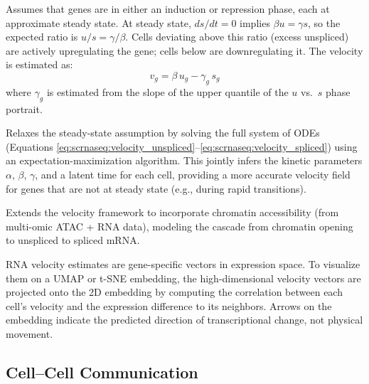\begin{description}[style=nextline]
  \item[Steady-state model (\software{velocyto})] Assumes that genes are in
    either an induction or repression phase, each at approximate steady state.
    At steady state, $ds/dt = 0$ implies $\beta u = \gamma s$, so the expected
    ratio is $u/s = \gamma/\beta$. Cells deviating above this ratio (excess
    unspliced) are actively upregulating the gene; cells below are downregulating
    it. The velocity is estimated as:
    \begin{equation}
      \label{eq:scrnaseq:velocity_ss}
      v_g = \beta\, u_g - \gamma_g\, s_g
    \end{equation}
    where $\gamma_g$ is estimated from the slope of the upper quantile of the
    $u$ vs.\ $s$ phase portrait.
  \item[Dynamical model (\software{scVelo})] Relaxes the steady-state assumption
    by solving the full system of ODEs (Equations
    \ref{eq:scrnaseq:velocity_unspliced}--\ref{eq:scrnaseq:velocity_spliced})
    using an expectation-maximization algorithm. This jointly infers the kinetic
    parameters $\alpha$, $\beta$, $\gamma$, and a latent time for each cell,
    providing a more accurate velocity field for genes that are not at steady
    state (e.g., during rapid transitions).
  \item[Multi-omic velocity (\software{MultiVelo})] Extends the velocity
    framework to incorporate chromatin accessibility (from multi-omic
    ATAC + RNA data), modeling the cascade from chromatin opening to unspliced
    to spliced mRNA.
\end{description}

\begin{tipbox}
RNA velocity estimates are gene-specific vectors in expression space. To
visualize them on a UMAP or t-SNE embedding, the high-dimensional velocity
vectors are projected onto the 2D embedding by computing the correlation between
each cell's velocity and the expression difference to its neighbors. Arrows on
the embedding indicate the predicted direction of transcriptional change, not
physical movement.
\end{tipbox}

\subsection{Cell--Cell Communication}


